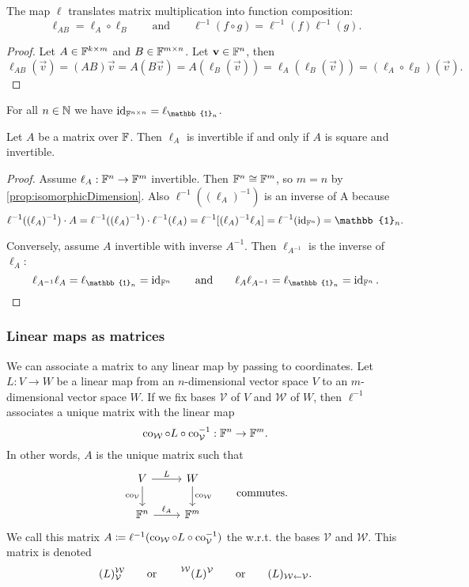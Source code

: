 \begin{proposition}
The map $\ell$ translates matrix multiplication into function composition:
\[ \ell_{AB} = \ell_A \circ \ell_B \qquad\text{and}\qquad \ell^{-1}(f\circ g) = \ell^{-1}(f)\ell^{-1}(g). \]
\end{proposition}
\begin{proof}
Let $A\in \mathbb{F}^{k\times m}$ and $B\in \mathbb{F}^{m\times n}$. Let $\bm{\mathrm{v}}\in\mathbb{F}^n$, then
\[ \ell_{AB}(\vec{v}) = (AB)\vec{v} = A(B\vec{v}) = A(\ell_B(\vec{v})) = \ell_A(\ell_B(\vec{v})) = (\ell_A\circ\ell_B)(\vec{v}). \]
\end{proof}

\begin{lemma}
For all $n\in\mathbb{N}$ we have $\id_{\F^{n\times n}} = \ell_{\mathbb{1}_n}$.
\end{lemma}

\begin{lemma} \label{lemma:invertibleMapInvertibleMatrix}
Let $A$ be a matrix over $\mathbb{F}$. Then $\ell_A$ is invertible \textup{if and only if} $A$ is square and invertible.
\end{lemma}
\begin{proof}
Assume $\ell_A: \mathbb{F}^n\to\mathbb{F}^m$ invertible. Then $\mathbb{F}^n\cong\mathbb{F}^m$, so $m=n$ by \ref{prop:isomorphicDimension}. Also $\ell^{-1}((\ell_A)^{-1})$ is an inverse of A because
\[ \ell^{-1}((\ell_A)^{-1})\cdot A = \ell^{-1}((\ell_A)^{-1})\cdot\ell^{-1}(\ell_A) = \ell^{-1}[(\ell_A)^{-1}\ell_A] = \ell^{-1}(\id_{\F^n}) = \mathbb{1}_n. \]

Conversely, assume $A$ invertible with inverse $A^{-1}$. Then $\ell_{A^{-1}}$ is the inverse of $\ell_A$:
\[ \ell_{A^{-1}}\ell_A = \ell_{\mathbb{1}_n} = \id_{\F^n} \qquad \text{and}\qquad \ell_A\ell_{A^{-1}} = \ell_{\mathbb{1}_n} = \id_{\F^n}. \]
\end{proof}

\subsubsection{Linear maps as matrices}
We can associate a matrix to any linear map by passing to coordinates. Let $L: V\to W$ be a linear map from an $n$-dimensional vector space $V$ to an $m$-dimensional vector space $W$. If we fix bases $\mathcal{V}$ of $V$ and $\mathcal{W}$ of $W$, then $\ell^{-1}$ associates a unique matrix with the linear map
\[ \operatorname{co}_{\mathcal{W}}\circ L \circ \operatorname{co}^{-1}_{\mathcal{V}}: \mathbb{F}^n\to\mathbb{F}^m. \]
In other words, $A$ is the unique matrix such that
\[ \begin{tikzcd}
V\rar{L}\dar[swap]{\co_{\mathcal{V}}} & W \dar{\co_{\mathcal{W}}} \\
\F^n \rar{\ell_A} & \F^m
\end{tikzcd} \qquad \text{commutes.} \]
We call this matrix $A \coloneqq \ell^{-1}(\operatorname{co}_{\mathcal{W}}\circ L \circ \operatorname{co}^{-1}_{\mathcal{V}})$ the  w.r.t. the bases $\mathcal{V}$ and $\mathcal{W}$. This matrix is denoted
\[ (L)_{\mathcal{V}}^{\mathcal{W}} \qquad \text{or}\qquad \prescript{\mathcal{W}}{}{(L)}^{\mathcal{V}} \qquad \text{or}\qquad (L)_{\mathcal{W}\leftarrow \mathcal{V}}. \]

